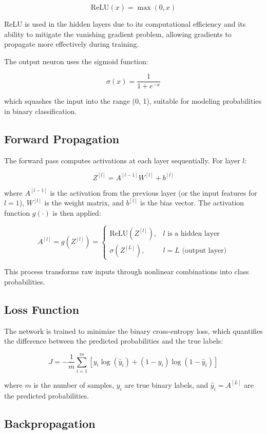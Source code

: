 \documentclass[12pt]{article}
\begin{document}
\[
\text{ReLU}(x) = \max(0, x)
\]

ReLU is used in the hidden layers due to its computational efficiency and its ability to mitigate the vanishing gradient problem, allowing gradients to propagate more effectively during training.

The output neuron uses the sigmoid function:

\[
\sigma(x) = \frac{1}{1 + e^{-x}}
\]

which squashes the input into the range (0, 1), suitable for modeling probabilities in binary classification.

\subsection{Forward Propagation}

The forward pass computes activations at each layer sequentially. For layer \( l \):

\[
Z^{[l]} = A^{[l-1]} W^{[l]} + b^{[l]}
\]

where \( A^{[l-1]} \) is the activation from the previous layer (or the input features for \( l=1 \)), \( W^{[l]} \) is the weight matrix, and \( b^{[l]} \) is the bias vector. The activation function \( g(\cdot) \) is then applied:

\[
A^{[l]} = g(Z^{[l]}) = 
\begin{cases}
\text{ReLU}(Z^{[l]}), & l \text{ is a hidden layer} \\
\sigma(Z^{[L]}), & l = L \text{ (output layer)}
\end{cases}
\]

This process transforms raw inputs through nonlinear combinations into class probabilities.

\subsection{Loss Function}

The network is trained to minimize the binary cross-entropy loss, which quantifies the difference between the predicted probabilities and the true labels:

\[
J = -\frac{1}{m} \sum_{i=1}^m \left[ y_i \log(\hat{y}_i) + (1 - y_i) \log(1 - \hat{y}_i) \right]
\]

where \( m \) is the number of samples, \( y_i \) are true binary labels, and \( \hat{y}_i = A^{[L]} \) are the predicted probabilities.

\subsection{Backpropagation}
\end{document}
